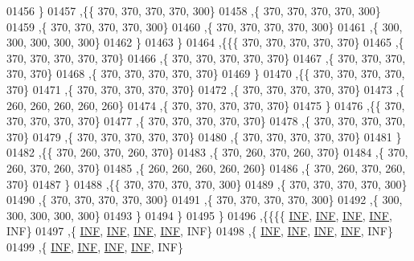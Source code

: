 \begin{DoxyCode}
01456    \}
01457   ,\{\{   370,   370,   370,   370,   300\}
01458    ,\{   370,   370,   370,   370,   300\}
01459    ,\{   370,   370,   370,   370,   300\}
01460    ,\{   370,   370,   370,   370,   300\}
01461    ,\{   300,   300,   300,   300,   300\}
01462    \}
01463   \}
01464  ,\{\{\{   370,   370,   370,   370,   370\}
01465    ,\{   370,   370,   370,   370,   370\}
01466    ,\{   370,   370,   370,   370,   370\}
01467    ,\{   370,   370,   370,   370,   370\}
01468    ,\{   370,   370,   370,   370,   370\}
01469    \}
01470   ,\{\{   370,   370,   370,   370,   370\}
01471    ,\{   370,   370,   370,   370,   370\}
01472    ,\{   370,   370,   370,   370,   370\}
01473    ,\{   260,   260,   260,   260,   260\}
01474    ,\{   370,   370,   370,   370,   370\}
01475    \}
01476   ,\{\{   370,   370,   370,   370,   370\}
01477    ,\{   370,   370,   370,   370,   370\}
01478    ,\{   370,   370,   370,   370,   370\}
01479    ,\{   370,   370,   370,   370,   370\}
01480    ,\{   370,   370,   370,   370,   370\}
01481    \}
01482   ,\{\{   370,   260,   370,   260,   370\}
01483    ,\{   370,   260,   370,   260,   370\}
01484    ,\{   370,   260,   370,   260,   370\}
01485    ,\{   260,   260,   260,   260,   260\}
01486    ,\{   370,   260,   370,   260,   370\}
01487    \}
01488   ,\{\{   370,   370,   370,   370,   300\}
01489    ,\{   370,   370,   370,   370,   300\}
01490    ,\{   370,   370,   370,   370,   300\}
01491    ,\{   370,   370,   370,   370,   300\}
01492    ,\{   300,   300,   300,   300,   300\}
01493    \}
01494   \}
01495  \}
01496 ,\{\{\{\{   \hyperlink{constants_8h_a12c2040f25d8e3a7b9e1c2024c618cb6}{INF},   \hyperlink{constants_8h_a12c2040f25d8e3a7b9e1c2024c618cb6}{INF},   \hyperlink{constants_8h_a12c2040f25d8e3a7b9e1c2024c618cb6}{INF},   \hyperlink{constants_8h_a12c2040f25d8e3a7b9e1c2024c618cb6}{INF},   INF\}
01497    ,\{   \hyperlink{constants_8h_a12c2040f25d8e3a7b9e1c2024c618cb6}{INF},   \hyperlink{constants_8h_a12c2040f25d8e3a7b9e1c2024c618cb6}{INF},   \hyperlink{constants_8h_a12c2040f25d8e3a7b9e1c2024c618cb6}{INF},   \hyperlink{constants_8h_a12c2040f25d8e3a7b9e1c2024c618cb6}{INF},   INF\}
01498    ,\{   \hyperlink{constants_8h_a12c2040f25d8e3a7b9e1c2024c618cb6}{INF},   \hyperlink{constants_8h_a12c2040f25d8e3a7b9e1c2024c618cb6}{INF},   \hyperlink{constants_8h_a12c2040f25d8e3a7b9e1c2024c618cb6}{INF},   \hyperlink{constants_8h_a12c2040f25d8e3a7b9e1c2024c618cb6}{INF},   INF\}
01499    ,\{   \hyperlink{constants_8h_a12c2040f25d8e3a7b9e1c2024c618cb6}{INF},   \hyperlink{constants_8h_a12c2040f25d8e3a7b9e1c2024c618cb6}{INF},   \hyperlink{constants_8h_a12c2040f25d8e3a7b9e1c2024c618cb6}{INF},   \hyperlink{constants_8h_a12c2040f25d8e3a7b9e1c2024c618cb6}{INF},   INF\}

\end{DoxyCode}
